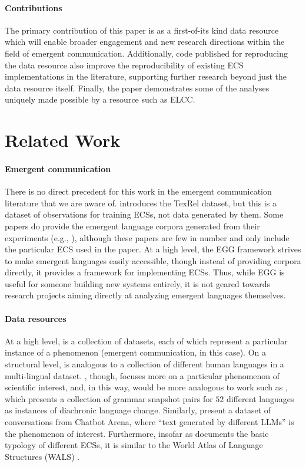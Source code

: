\paragraph{Contributions}
The primary contribution of this paper is as a first-of-its kind data resource which will enable broader engagement and new research directions within the field of emergent communication.
Additionally, code published for reproducing the data resource also improve the reproducibility of existing ECS implementations in the literature, supporting further research beyond just the data resource itself.
Finally, the paper demonstrates some of the analyses uniquely made possible by a resource such as ELCC\@.

\section{Related Work}
\unskip\label{elcc:sec:related-work}

\paragraph{Emergent communication}
There is no direct precedent for this work in the emergent communication literature that we are aware of.
\citet{perkins2021texrel} introduces the TexRel dataset, but this is a dataset of observations for training ECSs, not data generated by them.
Some papers do provide the emergent language corpora generated from their experiments (e.g., \citet{yao2022linking}), although these papers are few in number and only include the particular ECS used in the paper.
At a high level, the EGG framework \citep{kharitonov-etal-2019-egg} strives to make emergent languages easily accessible,
  though instead of providing corpora directly, it provides a framework for implementing ECSs.
Thus, while EGG is useful for someone building new systems entirely, it is not geared towards research projects aiming directly at analyzing emergent languages themselves.

\paragraph{Data resources}
At a high level, \theLib{} is a collection of datasets, each of which represent a particular instance of a phenomenon (emergent communication, in this case).
On a structural level, \theLib{} is analogous to a collection of different human languages in a multi-lingual dataset.
\theLib{}, though, focuses more on a particular phenomenon of scientific interest, and, in this way, would be more analogous to work such as \citet{blum2023grammars}, which presents a collection of grammar snapshot pairs for $52$ different languages as instances of diachronic language change.
Similarly, \citet{zheng2024judging} present a dataset of conversations from Chatbot Arena, where ``text generated by different LLMs'' is the phenomenon of interest.
Furthermore, insofar as \theLib{} documents the basic typology of different ECSs, it is similar to the World Atlas of Language Structures (WALS) \citep{wals}.


